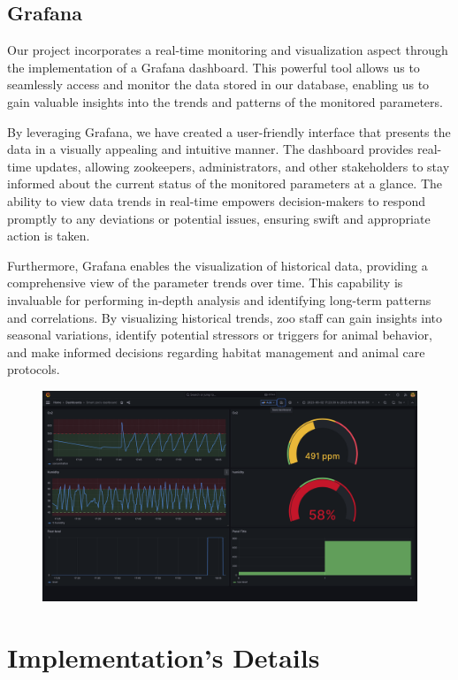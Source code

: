 \documentclass[parskip=full]{report}
\begin{document}
\section{Grafana}

Our project incorporates a real-time monitoring and visualization aspect through the implementation of a Grafana dashboard. This powerful tool allows us to seamlessly access and monitor the data stored in our database, enabling us to gain valuable insights into the trends and patterns of the monitored parameters.

By leveraging Grafana, we have created a user-friendly interface that presents the data in a visually appealing and intuitive manner. The dashboard provides real-time updates, allowing zookeepers, administrators, and other stakeholders to stay informed about the current status of the monitored parameters at a glance. The ability to view data trends in real-time empowers decision-makers to respond promptly to any deviations or potential issues, ensuring swift and appropriate action is taken.

Furthermore, Grafana enables the visualization of historical data, providing a comprehensive view of the parameter trends over time. This capability is invaluable for performing in-depth analysis and identifying long-term patterns and correlations. By visualizing historical trends, zoo staff can gain insights into seasonal variations, identify potential stressors or triggers for animal behavior, and make informed decisions regarding habitat management and animal care protocols.

\begin{figure}[H]
	\centering
	\includegraphics[width=0.9\linewidth]{"assets/grafana iot"}
	\caption{}
	\label{fig:grafana-iot}
\end{figure}


\chapter{Implementation's Details}
\end{document}
